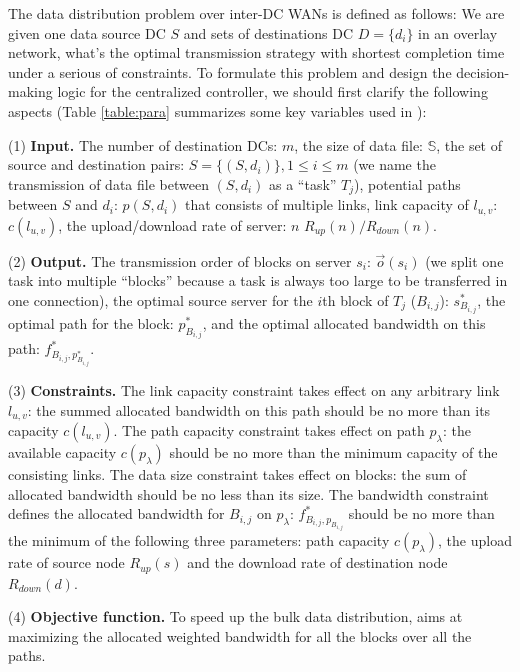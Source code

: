The data distribution problem over inter-DC WANs is defined as follows: We are given one data source DC $S$ and sets of destinations DC $D=\{d_i\}$ in an overlay network, what's the optimal transmission strategy with shortest completion time under a serious of constraints. To formulate this problem and design the decision-making logic for the centralized controller, we should first clarify the following aspects (Table \ref{table:para} summarizes some key variables used in \name):

(1) \textbf{Input.} The number of destination DCs: $m$, the size of data file: $\mathbb{S}$, the set of source and destination pairs: $S=\{(S,d_i)\}, 1\leq i\leq m$ (we name the transmission of data file between $(S,d_i)$ as a ``task'' $T_j$), potential paths between $S$ and $d_i$: $p(S,d_i)$ that consists of multiple links, link capacity of $l_{u,v}$: $c(l_{u,v})$, the upload/download rate of server: $n$ $R_{up}(n)/R_{down}(n)$.

(2) \textbf{Output.} The transmission order of blocks on server $s_i$: $\overrightarrow{o}(s_i)$ (we split one task into multiple ``blocks'' because a task is always too large to be transferred in one connection), the optimal source server for the $i$th block of $T_j$ ($B_{i,j}$): $s_{B_{i,j}}^*$, the optimal path for the block: $p_{B_{i,j}}^*$, and the optimal allocated bandwidth on this path: $f^*_{B_{i,j},p_{B_{i,j}}^*}$.

(3) \textbf{Constraints.} The link capacity constraint takes effect on any arbitrary link $l_{u,v}$: the summed allocated bandwidth on this path should be no more than its capacity $c(l_{u,v})$. The path capacity constraint takes effect on path $p_\lambda$: the available capacity $c(p_\lambda)$ should be no more than the minimum capacity of the consisting links. The data size constraint takes effect on blocks: the sum of allocated bandwidth should be no less than its size. The bandwidth constraint defines the allocated bandwidth for $B_{i,j}$ on $p_\lambda$: $f^*_{B_{i,j},p_{B_{i,j}}}$ should be no more than the minimum of the following three parameters: path capacity $c(p_\lambda)$, the upload rate of source node $R_{up}(s)$ and the download rate of destination node $R_{down}(d)$.

(4) \textbf{Objective function.} To speed up the bulk data distribution, \name aims at maximizing the allocated weighted bandwidth for all the blocks over all the paths.

